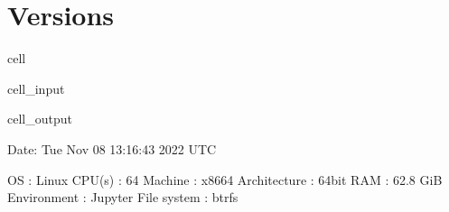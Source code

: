 \documentclass[letterpaper,10pt,english]{jupyterBook}
\begin{document}
\section{Versions}
\label{\detokenize{tests/plotly_surface_render_test:versions}}
\begin{sphinxuseclass}{cell}\begin{sphinxVerbatimInput}

\begin{sphinxuseclass}{cell_input}
\begin{sphinxVerbatim}[commandchars=\\\{\}]
 
\PYG{p}{[} \PYG{p}{]}
\end{sphinxVerbatim}

\end{sphinxuseclass}\end{sphinxVerbatimInput}
\begin{sphinxVerbatimOutput}

\begin{sphinxuseclass}{cell_output}
\begin{sphinxVerbatim}[commandchars=\\\{\}]
\PYGZhy{}\PYGZhy{}\PYGZhy{}\PYGZhy{}\PYGZhy{}\PYGZhy{}\PYGZhy{}\PYGZhy{}\PYGZhy{}\PYGZhy{}\PYGZhy{}\PYGZhy{}\PYGZhy{}\PYGZhy{}\PYGZhy{}\PYGZhy{}\PYGZhy{}\PYGZhy{}\PYGZhy{}\PYGZhy{}\PYGZhy{}\PYGZhy{}\PYGZhy{}\PYGZhy{}\PYGZhy{}\PYGZhy{}\PYGZhy{}\PYGZhy{}\PYGZhy{}\PYGZhy{}\PYGZhy{}\PYGZhy{}\PYGZhy{}\PYGZhy{}\PYGZhy{}\PYGZhy{}\PYGZhy{}\PYGZhy{}\PYGZhy{}\PYGZhy{}\PYGZhy{}\PYGZhy{}\PYGZhy{}\PYGZhy{}\PYGZhy{}\PYGZhy{}\PYGZhy{}\PYGZhy{}\PYGZhy{}\PYGZhy{}\PYGZhy{}\PYGZhy{}\PYGZhy{}\PYGZhy{}\PYGZhy{}\PYGZhy{}\PYGZhy{}\PYGZhy{}\PYGZhy{}\PYGZhy{}\PYGZhy{}\PYGZhy{}\PYGZhy{}\PYGZhy{}\PYGZhy{}\PYGZhy{}\PYGZhy{}\PYGZhy{}\PYGZhy{}\PYGZhy{}\PYGZhy{}\PYGZhy{}\PYGZhy{}\PYGZhy{}\PYGZhy{}\PYGZhy{}\PYGZhy{}\PYGZhy{}\PYGZhy{}\PYGZhy{}
  Date: Tue Nov 08 13:16:43 2022 UTC

                OS : Linux
            CPU(s) : 64
           Machine : x86\PYGZus{}64
      Architecture : 64bit
               RAM : 62.8 GiB
       Environment : Jupyter
       File system : btrfs


\end{sphinxVerbatim}
\end{sphinxuseclass}
\end{sphinxVerbatimOutput}
\end{sphinxuseclass}
\end{document}
